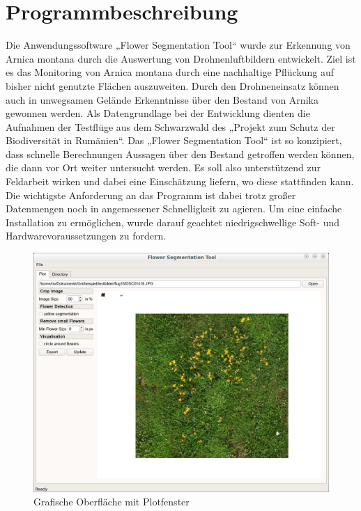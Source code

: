 \section{Programmbeschreibung}\label{programm}

Die Anwendungssoftware „Flower Segmentation Tool“ wurde zur Erkennung von Arnica montana durch die Auswertung von Drohnenluftbildern entwickelt. Ziel ist es das Monitoring von Arnica montana durch eine nachhaltige Pflückung auf bisher nicht genutzte Flächen auszuweiten. Durch den Drohneneinsatz können auch in unwegsamen Gelände Erkenntnisse über den Bestand von Arnika gewonnen werden. Als Datengrundlage bei der Entwicklung dienten die Aufnahmen der Testflüge aus dem Schwarzwald des „Projekt zum Schutz der Biodiversität in Rumänien“.
Das „Flower Segmentation Tool“ ist so konzipiert, dass schnelle Berechnungen Aussagen über den Bestand getroffen werden können, die dann vor Ort weiter untersucht werden. Es soll also unterstützend zur Feldarbeit wirken und dabei eine Einschätzung liefern, wo diese stattfinden kann.
Die wichtigste Anforderung an das Programm ist dabei trotz großer Datenmengen noch in angemessener Schnelligkeit zu agieren. Um eine einfache Installation zu ermöglichen, wurde darauf geachtet niedrigschwellige Soft- und Hardwarevoraussetzungen zu fordern. 

\begin{figure}[hbt]
 \centering
 \includegraphics[width=\textwidth,angle=0]{abb/gui/plot-fenster-mit}
 \caption{Grafische Oberfläche mit Plotfenster}
\label{fig:gui-plot}
\end{figure}

